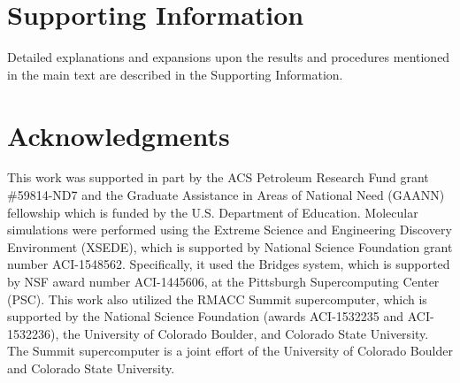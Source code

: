 \documentclass[journal=jpcbfk,manuscript=article]{achemso}
\begin{document}
  \section*{Supporting Information}

  Detailed explanations and expansions upon the results and procedures mentioned in
  the main text are described in the Supporting Information. 

  \section*{Acknowledgments}

  This work was supported in part by the ACS Petroleum Research Fund
  grant \#59814-ND7 and the Graduate Assistance in Areas of National Need (GAANN) 
  fellowship which is funded by the U.S. Department of Education. 
  Molecular simulations were performed using the Extreme Science and
  Engineering Discovery Environment (XSEDE), which is supported by National
  Science Foundation grant number ACI-1548562. Specifically, it used the Bridges
  system, which is supported by NSF award number ACI-1445606, at the Pittsburgh
  Supercomputing Center (PSC). This work also utilized the RMACC Summit supercomputer,
  which is supported by the National Science Foundation (awards ACI-1532235 and
  ACI-1532236), the University of Colorado Boulder, and Colorado State
  University. The Summit supercomputer is a joint effort of the University of
  Colorado Boulder and Colorado State University.

  \clearpage

  
  


\end{document}
